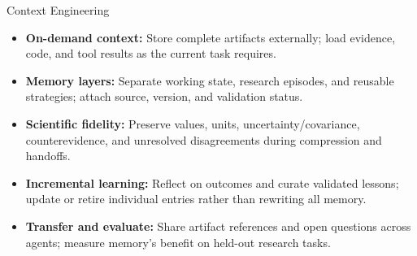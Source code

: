 \begin{frame}[t,label=md-50]{Context Engineering}
\small
\begin{itemize}
\setlength{\itemsep}{0.65em}
    \item \textbf{On-demand context:} Store complete artifacts externally;
    load evidence, code, and tool results as the current task requires.
    \item \textbf{Memory layers:} Separate working state, research episodes,
    and reusable strategies; attach source, version, and validation status.
    \item \textbf{Scientific fidelity:} Preserve values, units, uncertainty/covariance,
    counterevidence, and unresolved disagreements during compression and handoffs.
    \item \textbf{Incremental learning:} Reflect on outcomes and curate validated
    lessons; update or retire individual entries rather than rewriting all memory.
    \item \textbf{Transfer and evaluate:} Share artifact references and open
    questions across agents; measure memory's benefit on held-out research tasks.
\end{itemize}
\end{frame}

